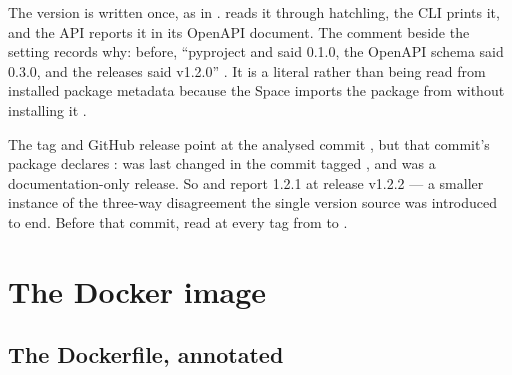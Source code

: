 The version is written once, as  in .  reads it through hatchling, the CLI prints it, and the API reports it in its OpenAPI document. The comment beside the setting records why: before, \enquote{pyproject and  said 0.1.0, the OpenAPI schema said 0.3.0, and the releases said v1.2.0} . It is a literal rather than being read from installed package metadata because the Space imports the package from  without installing it .

\begin{finding}
The tag and GitHub release  point at the analysed commit , but that commit's package declares :  was last changed in the commit tagged , and  was a documentation-only release. So  and  report 1.2.1 at release v1.2.2 --- a smaller instance of the three-way disagreement the single version source was introduced to end. Before that commit,  read  at every tag from  to .
\end{finding}

\section{The Docker image}
\label{sec:docker}

\subsection{The Dockerfile, annotated}

